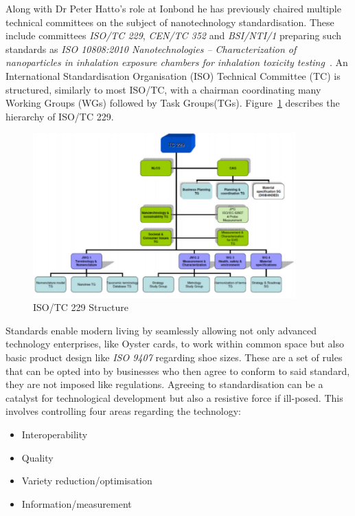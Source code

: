 
{}

Along with Dr Peter Hatto's role at Ionbond he has previously chaired multiple technical committees on the subject of nanotechnology standardisation.
These include committees \emph{ISO/TC 229}, \emph{CEN/TC 352} and \emph{BSI/NTI/1} preparing such standards as \emph{ISO 10808:2010 Nanotechnologies -- Characterization of nanoparticles in inhalation exposure chambers for inhalation toxicity testing}~\cite{iso10808}.
An International Standardisation Organisation (ISO) Technical Committee (TC) is structured, similarly to most ISO/TC, with a chairman coordinating many Working Groups (WGs) followed by Task Groups(TGs).
Figure~\ref{figure:tc229} describes the hierarchy of ISO/TC 229. 

\begin{figure}[!h]
\centering
\includegraphics[width = 0.9\textwidth]{Figures/TC229.pdf}
\caption{ISO/TC 229 Structure \cite{isotc229}}
\label{figure:tc229}
\end{figure}

Standards enable modern living by seamlessly allowing not only advanced technology enterprises, like Oyster cards, to work within common space but also basic product design like \emph{ISO 9407} regarding shoe sizes.
These are a set of rules that can be opted into by businesses who then agree to conform to said standard, they are not imposed like regulations.
Agreeing to standardisation can be a catalyst for technological development but also a resistive force if ill-posed.  
This involves controlling four areas regarding the technology:

\begin{itemize}
	\item Interoperability
	\item Quality
	\item Variety reduction/optimisation
	\item Information/measurement
\end{itemize}

